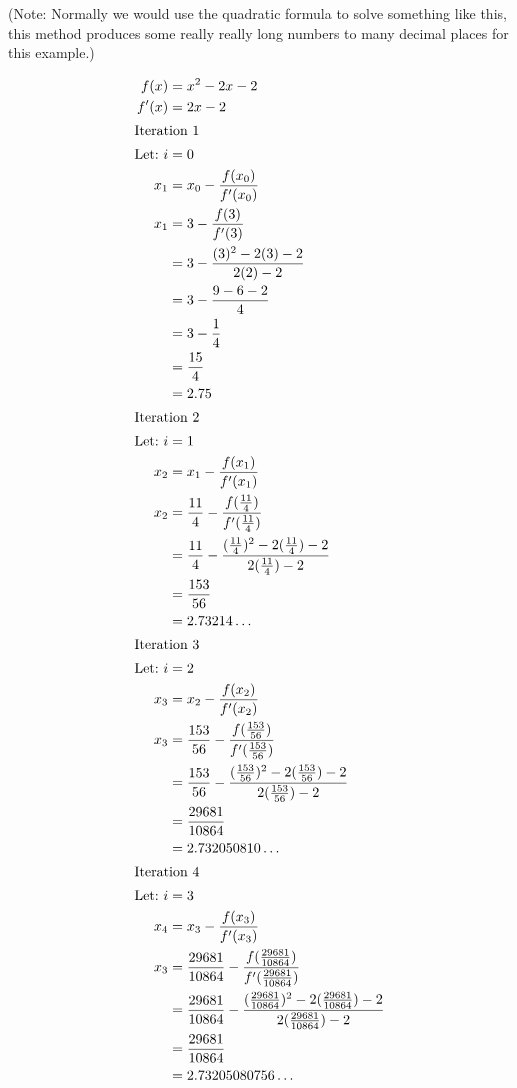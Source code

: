 \noindent (Note: Normally we would use the quadratic formula to solve something
like this, this method produces some really really long numbers to many decimal
places for this example.)

\begin{align}
  f(x)  &= x^2 -2x -2 \\
  f'(x) &= 2x -2 \\
\intertext{Iteration 1}
  \text{Let:} ~
      i &= 0 \\
    x_1 &= x_0 -\frac{f(x_0)}{f'(x_0)} \\
    x_1 &= 3 -\frac{f(3)}{f'(3)} \\
        &= 3 -\frac{(3)^2 - 2(3)-2}{2(2)-2} \\
        &= 3 -\frac{9 -6 -2}{4} \\
        &= 3 -\frac{1}{4} \\
        &= \frac{15}{4} \\
        &= 2.75 \\
\intertext{Iteration 2}
  \text{Let:} ~
      i &= 1 \\
    x_2 &= x_1 -\frac{f(x_1)}{f'(x_1)} \\
    x_2 &= \frac{11}{4} -\frac{f(\frac{11}{4})}{f'(\frac{11}{4})} \\
        &= \frac{11}{4} -\frac{(\frac{11}{4})^2 - 2(\frac{11}{4})-2}{2(\frac{11}{4})-2} \\
        &= \frac{153}{56} \\
        &= 2.73214\ldots \\
\intertext{Iteration 3}
  \text{Let:} ~
      i &= 2 \\
    x_3 &= x_2 -\frac{f(x_2)}{f'(x_2)} \\
    x_3 &= \frac{153}{56} -\frac{f(\frac{153}{56})}{f'(\frac{153}{56})} \\
        &= \frac{153}{56} -\frac{(\frac{153}{56})^2 - 2(\frac{153}{56})-2}{2(\frac{153}{56})-2} \\
        &= \frac{29681}{10864} \\
        &= 2.732050810\ldots \\
\intertext{Iteration 4}
  \text{Let:} ~
      i &= 3 \\
    x_4 &= x_3 -\frac{f(x_3)}{f'(x_3)} \\
    x_3 &= \frac{29681}{10864} -\frac{f(\frac{29681}{10864})}{f'(\frac{29681}{10864})} \\
        &= \frac{29681}{10864} -\frac{(\frac{29681}{10864})^2 - 2(\frac{29681}{10864})-2}{2(\frac{29681}{10864})-2} \\
        &= \frac{29681}{10864} \\
        &= 2.73205080756\ldots
\end{align}